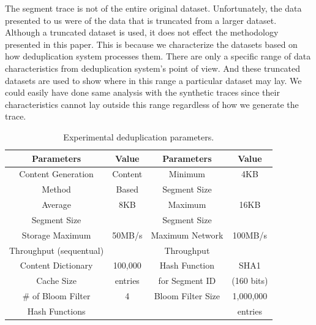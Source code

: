 The segment trace is not of the entire original dataset. Unfortunately, the data presented to us were of the data that is truncated from a larger dataset. Although a truncated dataset is used, it does not effect the methodology presented in this paper. This is because we characterize the datasets based on how deduplication system processes them. There are only a specific range of data characteristics from deduplication system's point of view. And these truncated datasets are used to show where in this range a particular dataset may lay. We could easily have done same analysis with the synthetic traces since their characteristics cannot lay outside this range regardless of how we generate the trace. 

\begin{table}[!t]
\renewcommand{\arraystretch}{1.3}
\caption{Experimental deduplication parameters.}
\label{ex_t}
\centering
\begin{tabular}{c|c|| c| c}
\hline
\bfseries Parameters 	&\bfseries Value		&\bfseries Parameters 	&\bfseries Value		\\
\hline\hline
Content Generation	&Content			&Minimum 			&4KB				\\
Method			&Based			&Segment Size		&				\\
\hline
Average			&8KB				&Maximum			&16KB			\\
Segment Size		&				&Segment Size		&				\\
\hline
Storage Maximum	 	&50MB/s 			&Maximum Network	&100MB/s			\\
Throughput (sequentual)	& 				&Throughput		&				\\
\hline
Content Dictionary		&100,000			&Hash Function		&SHA1			\\
Cache Size			&entries			&for Segment ID		&(160 bits)			\\
\hline
\# of Bloom Filter 		&4				&Bloom Filter Size		&1,000,000			\\
Hash Functions 		&				&				&entries			\\
\hline
\end{tabular}
\end{table}

